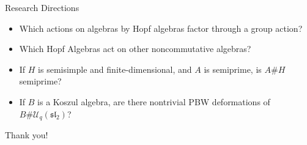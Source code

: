 \documentclass{beamer}
\newcommand\1{_{(1)}}
\newcommand\2{_{(2)}}
\begin{document}
\begin{frame}{Research Directions}
    \begin{itemize}
    \setlength{\itemsep}{2ex}
        \item<1-> Which actions on algebras by Hopf algebras factor through a group action?
        \item<2-> Which Hopf Algebras act on other noncommutative algebras?
        \item<3-> If $H$ is semisimple and finite-dimensional, and $A$ is semiprime, is $A\#H$ semiprime?
        \item<4-> If $B$ is a Koszul algebra, are there nontrivial PBW deformations of $B\# \mathcal{U}_q(\mathfrak{sl_2})$?
    \end{itemize}
\end{frame}

\begin{frame}

    \begin{center}
    Thank you!
    \end{center}
    
\end{frame}
\end{document}
